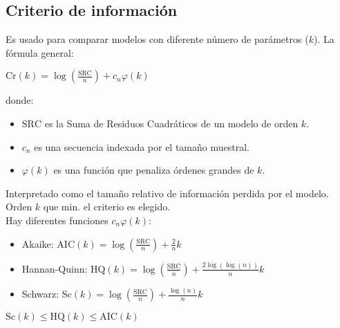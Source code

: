 \documentclass[10pt, a4paper, landscape]{extarticle}
\newcommand{\SRC}{\mathrm{SRC}}
\begin{document}
\begin{multicols}{3}
\section*{Criterio de información}
	Es usado para comparar modelos con diferente número de parámetros ($k$). La fórmula general:
	\begin{center}
		$\mathrm{Cr}(k) = \log(\frac{\SRC}{n}) + c_n \varphi (k)$
	\end{center}
	donde:
	\begin{itemize}[leftmargin=*]
		\item $\SRC$ es la Suma de Residuos Cuadráticos de un modelo de orden $k$.
		\item $c_n$ es una secuencia indexada por el tamaño muestral.
		\item $\varphi(k)$ es una función que penaliza órdenes grandes de $k$.
	\end{itemize}
	Interpretado como el tamaño relativo de información perdida por el modelo. Orden $k$ que min. el criterio es elegido. \\
	Hay diferentes funciones $c_n \varphi(k)$:
	\begin{itemize}[leftmargin=*]
		\item Akaike: $\mathrm{AIC}(k) = \log(\frac{\SRC}{n}) + \frac{2}{n} k$
		\item Hannan-Quinn: $\mathrm{HQ}(k) = \log(\frac{\SRC}{n}) + \frac{2 \log(\log(n))}{n} k$
		\item Schwarz: $\mathrm{Sc}(k) = \log(\frac{\SRC}{n}) + \frac{\log(n)}{n} k$
	\end{itemize}
	$\mathrm{Sc}(k) \leq \mathrm{HQ}(k) \leq \mathrm{AIC}(k)$


\end{multicols}
\end{document}
